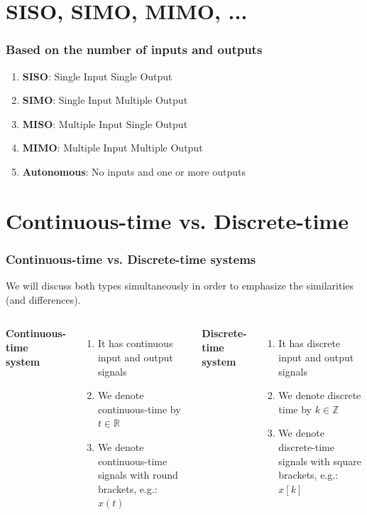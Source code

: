 \section{SISO, SIMO, MIMO, ...} 

\begin{frame}
	\frametitle{Based on the number of inputs and outputs}
	\vspace{-8ex}
	\begin{enumerate}
		\item \textbf{SISO}: Single Input Single Output
		\medskip
		\item \textbf{SIMO}: Single Input Multiple Output
		\medskip
		\item \textbf{MISO}: Multiple Input Single Output
		\medskip
		\item \textbf{MIMO}: Multiple Input Multiple Output
		\medskip
		\item \textbf{Autonomous}: No inputs and one or more outputs
	\end{enumerate}
\end{frame}

\section{Continuous-time vs. Discrete-time} 

\begin{frame}
	\frametitle{Continuous-time vs. Discrete-time systems}
	\vspace{-2ex}
	We will discuss both types simultaneously in order to emphasize the similarities (and differences).\\
	\medskip
	\begin{columns}[c] 
		
		\center \textbf{Continuous-time system}
		\begin{enumerate}
			\item It has continuous input and output signals
			\item We denote continuous-time by $t \in \mathds{R}$
			\item We denote continuous-time signals with round brackets, e.g.: $x(t)$
		\end{enumerate}
		
		\center \textbf{Discrete-time system}
		\begin{enumerate}
			\item It has discrete input and output signals
			\item We denote discrete time by $k \in \mathds{Z}$
			\item We denote discrete-time signals with square brackets, e.g.: $x[k]$
		\end{enumerate}
		
	\end{columns}
\end{frame}

